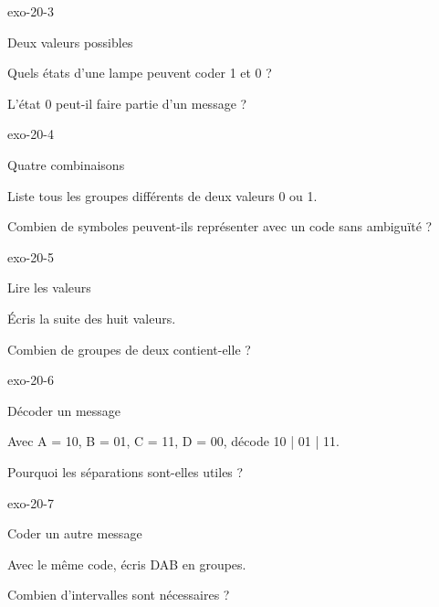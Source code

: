\documentclass[12pt,twoside,openany]{book}
\begin{document}
\begin{blocLivre}{exo-20-3}
\begin{exercice}[1]{Deux valeurs possibles}
\begin{questions}
\item Quels états d’une lampe peuvent coder 1 et 0 ?
\item L’état 0 peut-il faire partie d’un message ?
\end{questions}
\end{exercice}\end{blocLivre}
\begin{blocLivre}{exo-20-4}
\begin{exercice}[1]{Quatre combinaisons}
\begin{questions}
\item Liste tous les groupes différents de deux valeurs 0 ou 1.
\item Combien de symboles peuvent-ils représenter avec un code sans ambiguïté ?
\end{questions}
\end{exercice}\end{blocLivre}
\begin{blocLivre}{exo-20-5}
\begin{exercice}[1]{Lire les valeurs}
\begin{questions}
\item Écris la suite des huit valeurs.
\item Combien de groupes de deux contient-elle ?
\end{questions}
\end{exercice}\end{blocLivre}
\begin{blocLivre}{exo-20-6}
\begin{exercice}[2]{Décoder un message}
\begin{questions}
\item Avec A = 10, B = 01, C = 11, D = 00, décode 10 | 01 | 11.
\item Pourquoi les séparations sont-elles utiles ?
\end{questions}
\end{exercice}\end{blocLivre}
\begin{blocLivre}{exo-20-7}
\begin{exercice}[2]{Coder un autre message}
\begin{questions}
\item Avec le même code, écris DAB en groupes.
\item Combien d’intervalles sont nécessaires ?
\end{questions}
\end{exercice}\end{blocLivre}
\end{document}
